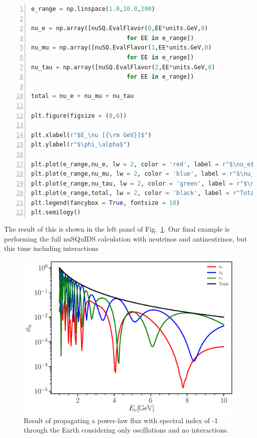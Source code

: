 \documentclass[3p,12pt]{elsarticle}
\newcounter{bla}
\begin{document}
\begin{lstlisting}[language=Python, frame=leftline, numbers=left, breaklines=true]
e_range = np.linspace(1.0,10.0,200)

nu_e = np.array([nuSQ.EvalFlavor(0,EE*units.GeV,0) 
                           for EE in e_range])
nu_mu = np.array([nuSQ.EvalFlavor(1,EE*units.GeV,0) 
                           for EE in e_range])
nu_tau = np.array([nuSQ.EvalFlavor(2,EE*units.GeV,0) 
                           for EE in e_range])

total = nu_e + nu_mu + nu_tau

plt.figure(figsize = (8,6))

plt.xlabel(r"$E_\nu [{\rm GeV}]$")
plt.ylabel(r"$\phi_\alpha$")

plt.plot(e_range,nu_e, lw = 2, color = 'red', label = r"$\nu_e$")
plt.plot(e_range,nu_mu, lw = 2, color = 'blue', label = r"$\nu_\mu$")
plt.plot(e_range,nu_tau, lw = 2, color = 'green', label = r"$\nu_\tau$")
plt.plot(e_range,total, lw = 2, color = 'black', label = r"Total")
plt.legend(fancybox = True, fontsize = 10)
plt.semilogy()
\end{lstlisting}
The result of this is shown in the left panel of Fig.~\ref{fig:nusquids_atm_python_no_interaction}. Our final example is 
performing the full nuSQuIDS calculation with neutrinos and antineutrinos, but this time including interactions

\begin{figure}[h!]
  \label{fig:nusquids_atm_python_no_interaction}
  \centering
  \includegraphics[width=\textwidth]{fig/nusquids_atm_python_no_int.eps}
  \caption{Result of propagating a power-law flux with spectral index of -1 through the Earth considering only oscillations and no interactions.}
\end{figure}
\end{document}
